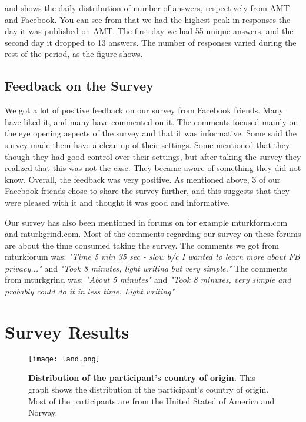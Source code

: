  and  shows the daily distribution of number of answers, respectively from AMT and Facebook. You can see from  that we had the highest peak in responses the day it was published on AMT. The first day we had 55 unique answers, and the second day it dropped to 13 answers. The number of responses varied during the rest of the period, as the figure shows. 

\subsection{Feedback on the Survey}
We got a lot of positive feedback on our survey from Facebook friends. Many have liked it, and many have commented on it. The comments focused mainly on the eye opening aspects of the survey and that it was informative. Some said the survey made them have a clean-up of their settings. Some mentioned that they though they had good control over their settings, but after taking the survey they realized that this was not the case. They became aware of something they did not know. Overall, the feedback was very positive. As mentioned above, 3 of our Facebook friends chose to share the survey further, and this suggests that they were pleased with it and thought it was good and informative. 

Our survey has also been mentioned in forums on for example mturkform.com and mturkgrind.com. Most of the comments regarding our survey on these forums are about the time consumed taking the survey. The comments we got from mturkforum was: \textit{"Time 5 min 35 sec - slow b/c I wanted to learn more about FB privacy..."} and \textit{"Took 8 minutes, light writing but very simple."}
The comments from mturkgrind was: \textit{"About 5 minutes"} and \textit{"Took 8 minutes, very simple and probably could do it in less time. Light writing"}


\section{Survey Results}

\begin{figure}[h!]
\centering
\texttt{[image: land.png]}
\caption[Distribution of the participant's country of origin]{\textbf{Distribution of the participant's country of origin.} This graph shows the distribution of the participant's country of origin. Most of the participants are from the United Stated of America and Norway.} 
\label{fig:land}
\end{figure}


